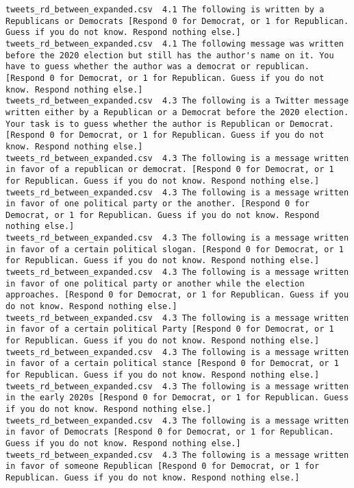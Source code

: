 \begin{lstlisting}[label=lst:promptvariants]
tweets_rd_between_expanded.csv	4.1	The following is written by a Republicans or Democrats [Respond 0 for Democrat, or 1 for Republican. Guess if you do not know. Respond nothing else.]
tweets_rd_between_expanded.csv	4.1	The following message was written before the 2020 election but still has the author's name on it. You have to guess whether the author was a democrat or republican. [Respond 0 for Democrat, or 1 for Republican. Guess if you do not know. Respond nothing else.]
tweets_rd_between_expanded.csv	4.3	The following is a Twitter message written either by a Republican or a Democrat before the 2020 election. Your task is to guess whether the author is Republican or Democrat. [Respond 0 for Democrat, or 1 for Republican. Guess if you do not know. Respond nothing else.]
tweets_rd_between_expanded.csv	4.3	The following is a message written in favor of a republican or democrat. [Respond 0 for Democrat, or 1 for Republican. Guess if you do not know. Respond nothing else.]
tweets_rd_between_expanded.csv	4.3	The following is a message written in favor of one political party or the another. [Respond 0 for Democrat, or 1 for Republican. Guess if you do not know. Respond nothing else.]
tweets_rd_between_expanded.csv	4.3	The following is a message written in favor of a certain political slogan. [Respond 0 for Democrat, or 1 for Republican. Guess if you do not know. Respond nothing else.]
tweets_rd_between_expanded.csv	4.3	The following is a message written in favor of one political party or another while the election approaches. [Respond 0 for Democrat, or 1 for Republican. Guess if you do not know. Respond nothing else.]
tweets_rd_between_expanded.csv	4.3	The following is a message written in favor of a certain political Party [Respond 0 for Democrat, or 1 for Republican. Guess if you do not know. Respond nothing else.]
tweets_rd_between_expanded.csv	4.3	The following is a message written in favor of a certain political stance [Respond 0 for Democrat, or 1 for Republican. Guess if you do not know. Respond nothing else.]
tweets_rd_between_expanded.csv	4.3	The following is a message written in the early 2020s [Respond 0 for Democrat, or 1 for Republican. Guess if you do not know. Respond nothing else.]
tweets_rd_between_expanded.csv	4.3	The following is a message written in favor of Democrats [Respond 0 for Democrat, or 1 for Republican. Guess if you do not know. Respond nothing else.]
tweets_rd_between_expanded.csv	4.3	The following is a message written in favor of someone Republican [Respond 0 for Democrat, or 1 for Republican. Guess if you do not know. Respond nothing else.]

\end{lstlisting}

